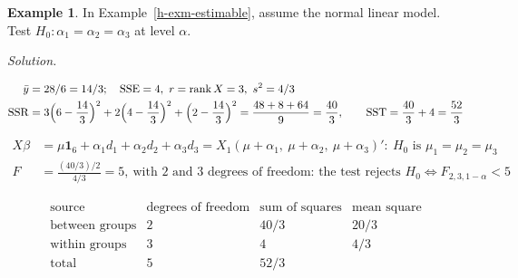 \documentclass[12pt]{article}
\newcommand{\one}{\mathbf 1}
\DeclareMathOperator{\rank}{rank}
\theoremstyle{definition}
\newtheorem{example}[theorem]{Example}
\newcommand{\boardtop}{\vspace*{-\abovedisplayskip}}
\begin{document}
\begin{example}\label{h-exm-oneway-f}
In Example~\ref{h-exm-estimable}, assume the normal linear model. Test \(H_0\colon\alpha_1=\alpha_2=\alpha_3\) at level
\(\alpha\).
\end{example}
\textit{Solution.}
\begin{board}[Group means \(6,4,2\) (\lec{11}, \lit{Example~7}); \(e=(-1,1,0,-1,1,0)'\), \(\mathrm{SSE}=4\) (\lec{11},
\lit{Example~11}); Theorem~\ref{h-thm-oneway-anova}:]
\boardtop
\begin{align*}
\bar y&=28/6=14/3;\quad\mathrm{SSE}=4,\ r=\rank X=3,\ s^2=4/3\\
\mathrm{SSR}&=3\Bigl(6-\frac{14}3\Bigr)^2+2\Bigl(4-\frac{14}3\Bigr)^2+\Bigl(2-\frac{14}3\Bigr)^2=\frac{48+8+64}9=\frac{40}3,
\qquad\mathrm{SST}=\frac{40}3+4=\frac{52}3
\end{align*}
\end{board}
\begin{board}[\(\one_6=d_1+d_2+d_3\); Corollary~\ref{h-cor-oneway-f} with \(n=6>g=3\):]
\boardtop
\begin{align*}
X\beta&=\mu\one_6+\alpha_1d_1+\alpha_2d_2+\alpha_3d_3=X_1(\mu+\alpha_1,\ \mu+\alpha_2,\ \mu+\alpha_3)':\ H_0\text{ is }\mu_1=\mu_2=\mu_3\\
F&=\frac{(40/3)/2}{4/3}=5,\ \text{with }2\text{ and }3\text{ degrees of freedom: the test rejects }H_0\iff F_{2,3,1-\alpha}<5
\end{align*}
\end{board}
\[
\begin{array}{lccc}
\text{source}&\text{degrees of freedom}&\text{sum of squares}&\text{mean square}\\\hline
\text{between groups}&2&40/3&20/3\\
\text{within groups}&3&4&4/3\\\hline
\text{total}&5&52/3&
\end{array}
\]
\end{document}

